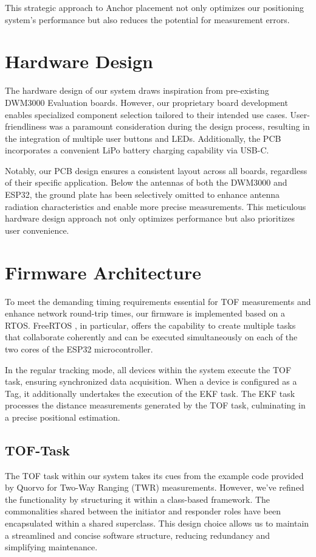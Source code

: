 \documentclass[10pt,a4paper,twocolumn]{article}
\begin{document}
This strategic approach to Anchor placement not only optimizes
our positioning system's performance but also reduces the potential
for measurement errors.

\section{Hardware Design}\label{section:hardware}
The hardware design of our system draws inspiration from pre-existing DWM3000 Evaluation
boards.
However, our proprietary board development enables specialized component selection
tailored to their intended use cases.
User-friendliness was a paramount consideration during the design process,
resulting in the integration of multiple user buttons and LEDs.
Additionally, the PCB incorporates a convenient LiPo battery charging capability
via USB-C.

Notably, our PCB design ensures a consistent layout across all boards,
regardless of their specific application.
Below the antennas of both the DWM3000 and ESP32,
the ground plate has been selectively omitted to enhance antenna radiation
characteristics and enable more precise measurements.
This meticulous hardware design approach not only optimizes
performance but also prioritizes user convenience. 

\section{Firmware Architecture}\label{section:firmware}
To meet the demanding timing requirements essential for \ac{TOF}
measurements and enhance network round-trip times,
our firmware is implemented based on a \ac{RTOS}.
FreeRTOS \cite{FreeRTOS_2023}, in particular,
offers the capability to create multiple tasks that collaborate coherently
and can be executed simultaneously on each of the two cores of the ESP32 microcontroller.

In the regular tracking mode,
all devices within the system execute the TOF task, ensuring synchronized data acquisition.
When a device is configured as a Tag,
it additionally undertakes the execution of the \ac{EKF} task.
The EKF task processes the distance measurements generated by the TOF task,
culminating in a precise positional estimation.

\subsection{TOF-Task}\label{section:firmware-tof}
The \ac{TOF} task within our system takes its cues from the example code
provided by Quorvo for Two-Way Ranging (TWR) measurements.
However, we've refined the functionality by structuring it within a class-based framework.
The commonalities shared between the initiator and responder roles have
been encapsulated within a shared superclass.
This design choice allows us to maintain a streamlined and concise software structure,
reducing redundancy and simplifying maintenance.
\end{document}
